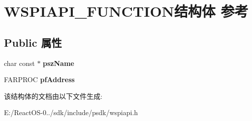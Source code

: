 \hypertarget{struct_w_s_p_i_a_p_i___f_u_n_c_t_i_o_n}{}\section{W\+S\+P\+I\+A\+P\+I\+\_\+\+F\+U\+N\+C\+T\+I\+O\+N结构体 参考}
\label{struct_w_s_p_i_a_p_i___f_u_n_c_t_i_o_n}
\subsection*{Public 属性}
\begin{DoxyCompactItemize}
\item 
\mbox{\label{struct_w_s_p_i_a_p_i___f_u_n_c_t_i_o_n_ade14fc89fa4b35effa5693b164b09491}} 
char const  $\ast$ {\bfseries psz\+Name}
\item 
\mbox{\label{struct_w_s_p_i_a_p_i___f_u_n_c_t_i_o_n_a4da0a8d0f901b1989023b3cf034d2b70}} 
F\+A\+R\+P\+R\+OC {\bfseries pf\+Address}
\end{DoxyCompactItemize}


该结构体的文档由以下文件生成\+:\begin{DoxyCompactItemize}
\item 
E\+:/\+React\+O\+S-\/0../sdk/include/psdk/wspiapi.\+h\end{DoxyCompactItemize}
